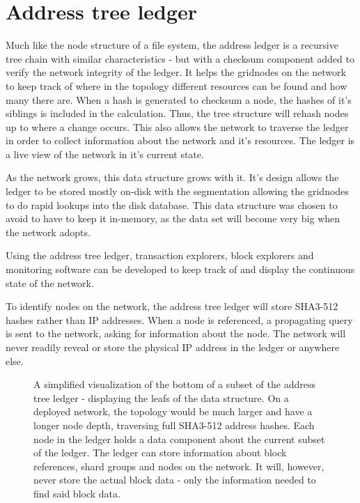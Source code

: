 \documentclass[10pt,a4paper,final]{article}
\begin{document}
\section{Address tree ledger}
\label{section:ledger}
Much like the node structure of a file system, the address ledger is a recursive tree chain with similar characteristics - but with a checksum component added to verify the network integrity of the ledger. It helps the \glspl{gridnode} on the network to keep track of where in the topology different resources can be found and how many there are. When a hash is generated to checksum a node, the hashes of it's siblings is included in the calculation. Thus, the tree structure will rehash nodes up to where a change occurs. This also allows the network to traverse the ledger in order to collect information about the network and it's resources. The ledger is a live view of the network in it's current state.

As the network grows, this data structure grows with it. It's design allows the ledger to be stored mostly on-disk with the segmentation allowing the \glspl{gridnode} to do rapid lookups into the disk database. This data structure was chosen to avoid to have to keep it in-memory, as the data set will become very big when the network adopts. 

Using the address tree ledger, transaction explorers, block explorers and monitoring software can be developed to keep track of and display the continuous state of the network.

To identify nodes on the network, the address tree ledger will store SHA3-512 hashes rather than IP addresses. When a node is referenced, a propagating query is sent to the network, asking for information about the node. The network will never readily reveal or store the physical IP address in the ledger or anywhere else.

\begin{figure}[H]
\centering
{}
\caption{A simplified visualization of the bottom of a subset of the address tree ledger - displaying the leafs of the data structure. On a deployed network, the topology would be much larger and have a longer node depth, traversing full SHA3-512 address hashes. Each node in the ledger holds a data component about the current subset of the ledger. The ledger can store information about block references, shard groups and nodes on the network. It will, however, never store the actual block data - only the information needed to find said block data.}
\end{figure}
\end{document}
